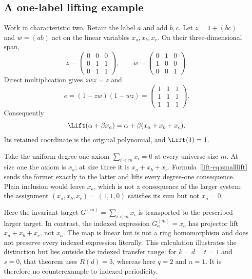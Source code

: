 \subsection{A one-label lifting example}\label{lift-sec:small}
Work in characteristic two. Retain the label $a$ and add $b,c$.
Let $z=1+(bc)$ and $w=(ab)$ act on the linear variables
$x_a,x_b,x_c$. On their three-dimensional span,
\[
 z=\begin{pmatrix}0&0&0\\0&1&1\\0&1&1\end{pmatrix},\qquad
 w=\begin{pmatrix}0&1&0\\1&0&0\\0&0&1\end{pmatrix}.
\]
Direct multiplication gives $zwz=z$ and
\[
                       e=(1-zw)(1-wz)
                         =\begin{pmatrix}1&1&1\\1&1&1\\1&1&1\end{pmatrix}.
\]
Consequently
\begin{equation}\label{lift-eq:smalllift}
                  \Lift(\alpha+\beta x_a)
                      =\alpha+\beta(x_a+x_b+x_c).
\end{equation}
Its retained coordinate is the original polynomial, and $\Lift(1)=1$.

Take the uniform degree-one axiom $\sum_{i<m}x_i=0$ at every universe size $m$.
At size one the axiom is $x_a$; at size three it is $x_a+x_b+x_c$.
Formula~\eqref{lift-eq:smalllift} sends the former exactly to the latter and
lifts every degree-one consequence. Plain inclusion would leave $x_a$,
which is not a consequence of the larger system: the assignment
$(x_a,x_b,x_c)=(1,1,0)$ satisfies its sum but not $x_a=0$.

Here the invariant target $G^{(m)}=\sum_{i<m}x_i$ is transported to
the prescribed larger target. In contrast, the indexed expression
$G_a^{(m)}=x_a$ has projector lift $x_a+x_b+x_c$, not $x_a$. The map
is linear but is not a ring homomorphism and does not preserve every
indexed expression literally. This calculation illustrates the distinction but lies outside the
indexed transfer range: for $k=d=t=1$ and $s=0$, that theorem uses
$R(d)=3$, whereas here $q=2$ and $n=1$. It is therefore no
counterexample to indexed periodicity.

